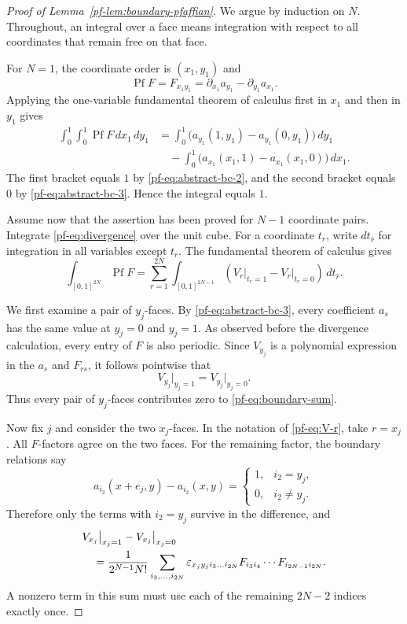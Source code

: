 \documentclass[11pt,reqno]{amsart}
\numberwithin{equation}{section}
\theoremstyle{definition}
\theoremstyle{remark}
\newcommand{\Pf}{\operatorname{Pf}}
\begin{document}
\begin{proof}[Proof of Lemma~\ref{pf-lem:boundary-pfaffian}]
We argue by induction on $N$.  Throughout, an integral over a face means
integration with respect to all coordinates that remain free on that face.

For $N=1$, the coordinate order is $(x_1,y_1)$ and
\[
 \Pf F=F_{x_1y_1}
 =\partial_{x_1}a_{y_1}-\partial_{y_1}a_{x_1}.
\]
Applying the one-variable fundamental theorem of calculus first in $x_1$
and then in $y_1$ gives
\begin{align*}
 \int_0^1\int_0^1\Pf F\,dx_1\,dy_1
 &=\int_0^1
 \bigl(a_{y_1}(1,y_1)-a_{y_1}(0,y_1)\bigr)\,dy_1\\
 &\quad-
 \int_0^1
 \bigl(a_{x_1}(x_1,1)-a_{x_1}(x_1,0)\bigr)\,dx_1.
\end{align*}
The first bracket equals $1$ by
\eqref{pf-eq:abstract-bc-2}, and the second bracket equals $0$ by
\eqref{pf-eq:abstract-bc-3}.  Hence the integral equals $1$.

Assume now that the assertion has been proved for $N-1$ coordinate pairs.
Integrate \eqref{pf-eq:divergence} over the unit cube.  For a coordinate
$t_r$, write $dt_{\widehat r}$ for integration in all variables except
$t_r$.  The fundamental theorem of calculus gives
\begin{equation}\label{pf-eq:boundary-sum}
 \int_{[0,1]^{2N}}\Pf F
 =\sum_{r=1}^{2N}
 \int_{[0,1]^{2N-1}}
 \left(V_r\big|_{t_r=1}-V_r\big|_{t_r=0}\right)
 \,dt_{\widehat r}.
\end{equation}

We first examine a pair of $y_j$-faces.  By
\eqref{pf-eq:abstract-bc-3}, every coefficient $a_s$ has the same value at
$y_j=0$ and $y_j=1$.  As observed before the divergence calculation, every
entry of $F$ is also periodic.  Since $V_{y_j}$ is a polynomial expression
in the $a_s$ and $F_{rs}$, it follows pointwise that
\[
 V_{y_j}\big|_{y_j=1}=V_{y_j}\big|_{y_j=0}.
\]
Thus every pair of $y_j$-faces contributes zero to
\eqref{pf-eq:boundary-sum}.

Now fix $j$ and consider the two $x_j$-faces.  In the notation of
\eqref{pf-eq:V-r}, take $r=x_j$.  All $F$-factors agree on the two faces.
For the remaining factor, the boundary relations say
\[
 a_{i_2}(x+e_j,y)-a_{i_2}(x,y)
 =\begin{cases}
 1,&i_2=y_j,\\
 0,&i_2\ne y_j.
 \end{cases}
\]
Therefore only the terms with $i_2=y_j$ survive in the difference, and
\begin{align}
 &V_{x_j}\big|_{x_j=1}-V_{x_j}\big|_{x_j=0}\notag\\
 &\quad=\frac{1}{2^{N-1}N!}
 \sum_{i_3,\ldots,i_{2N}}
 \varepsilon_{x_jy_ji_3\ldots i_{2N}}
 F_{i_3i_4}\cdots F_{i_{2N-1}i_{2N}}.
 \label{pf-eq:x-face-jump}
\end{align}
A nonzero term in this sum must use each of the remaining $2N-2$ indices
exactly once.


\end{proof}
\end{document}

